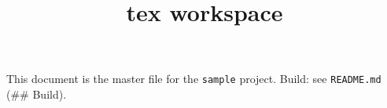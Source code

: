 \documentclass{article}
\begin{document}
\title{tex workspace}
\author{}
\date{}
\maketitle

This document is the master file for the \texttt{sample} project. Build: see \texttt{README.md} (\#\# Build).
\end{document}
